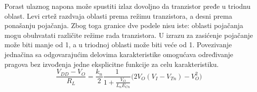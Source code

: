 Porast ulaznog napona može spustiti izlaz dovoljno da tranzistor pređe u triodnu oblast. Levi crtež razdvaja oblasti prema režimu tranzistora, a desni prema ponašanju pojačanja. Zbog toga granice dve podele nisu iste: oblasti pojačanja mogu obuhvatati različite režime rada tranzistora. U izrazu za zasićenje pojačanje može biti manje od 1, a u triodnoj oblasti može biti veće od 1. Povezivanje jednačina sa odgovarajućim delovima karakteristike omogućava određivanje pragova bez izvođenja jedne eksplicitne funkcije za celu karakteristiku.
\[\frac{V_{DD}-V_O}{R_L}=\frac{k_n}{2}\frac1{1+\frac{V_O}{L_nE_{Cn}}}\bigl(2V_O(V_I-V_{Tn})-V_O^2\bigr)\]

